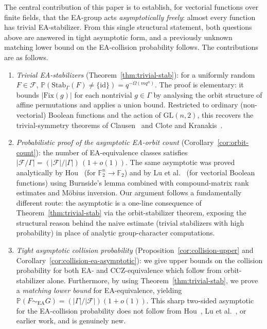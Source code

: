\documentclass[11pt]{article}
\theoremstyle{definition}
\newcommand{\F}{\mathbb{F}}
\newcommand{\Fcal}{\mathcal{F}}
\newcommand{\Gam}{\Gamma}
\newcommand{\GL}{\mathrm{GL}}
\newcommand{\id}{\mathrm{id}}
\newcommand{\Stab}{\mathrm{Stab}}
\newcommand{\Fix}{\mathrm{Fix}}
\renewcommand{\Pr}{\mathbb{P}}
\begin{document}
The central contribution of this paper is to establish, for vectorial functions over
finite fields, that the EA-group acts \emph{asymptotically freely}: almost every function
has trivial EA-stabilizer. From this single structural statement, both questions above
are answered in tight asymptotic form, and a previously unknown matching lower bound on
the EA-collision probability follows. The contributions are as follows.
\begin{enumerate}
\item \emph{Trivial EA-stabilizers} (Theorem~\ref{thm:trivial-stab}): for a uniformly random
$F\in\Fcal$, $\Pr(\Stab_\Gam(F)\neq\{\id\})=q^{-\Omega(mq^n)}$. The proof is
elementary: it bounds $|\Fix(g)|$ for each nontrivial $g\in\Gam$ by analysing the orbit
structure of affine permutations and applies a union bound. Restricted to ordinary
(non-vectorial) Boolean functions and the action of $\GL(n,2)$, this recovers the
trivial-symmetry theorems of Clausen~\cite{clausen1992} and Clote and
Kranakis~\cite{clote1991}.

\item \emph{Probabilistic proof of the asymptotic EA-orbit count}
(Corollary~\ref{cor:orbit-count}): the number of EA-equivalence classes satisfies
$|\Fcal/\Gam|=(|\Fcal|/|\Gam|)\,(1+o(1))$. The same asymptotic was proved
analytically by Hou~\cite{hou2021} (for $\F_2^n\to\F_2$) and by
Lu et al.~\cite{lu2023} (for vectorial Boolean functions) using
Burnside's lemma combined with compound-matrix rank estimates and M\"obius inversion.
Our argument follows a fundamentally different route: the asymptotic is a one-line
consequence of Theorem~\ref{thm:trivial-stab} via the orbit-stabilizer theorem,
exposing the structural reason behind the naive estimate
(trivial stabilizers with high probability) in place of analytic group-character
computations.

\item \emph{Tight asymptotic collision probability} (Proposition~\ref{cor:collision-upper}
and Corollary~\ref{cor:collision-ea-asymptotic}): we give upper bounds on the
collision probability for both EA- and CCZ-equivalence which follow from
orbit-stabilizer alone.
Furthermore, by using Theorem~\ref{thm:trivial-stab}, we prove a
\emph{matching lower bound} for EA-equivalence, yielding
$\Pr(F\sim_{\mathrm{EA}} G)=(|\Gam|/|\Fcal|)(1+o(1))$. This sharp two-sided
asymptotic for the EA-collision probability does not follow from
Hou~\cite{hou2021}, Lu et al.~\cite{lu2023}, or earlier work, and is genuinely new.
\end{enumerate}
\end{document}
